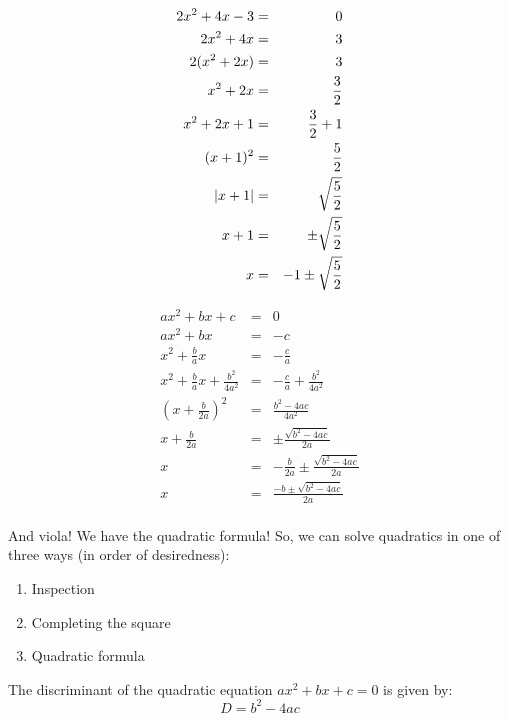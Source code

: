 \documentclass[letterpaper,12pt,fleqn]{article}
\begin{document}
\begin{minipage}[t]{3in}
  \begin{eqnarray*}
    2x^2+4x-3 &=& 0 \\
    2x^2+4x &=& 3 \\
    2(x^2+2x) &=& 3 \\
    x^2+2x &=& \frac{3}{2} \\
    x^2+2x+1 &=& \frac{3}{2}+1 \\
    (x+1)^2 &=& \frac{5}{2} \\
    \lvert x+1\rvert &=& \sqrt{\frac{5}{2}} \\
    x+1 &=& \pm\sqrt{\frac{5}{2}} \\
    x &=& -1\pm\sqrt{\frac{5}{2}} \\
  \end{eqnarray*}
\end{minipage}
\begin{minipage}[t]{3in}
  \begin{eqnarray*}
    ax^2+bx+c &=& 0 \\
    ax^2+bx &=& -c \\
    x^2+\frac{b}{a}x &=& -\frac{c}{a} \\
    x^2+\frac{b}{a}x+\frac{b^2}{4a^2} &=& -\frac{c}{a}+\frac{b^2}{4a^2} \\
    \left(x+\frac{b}{2a}\right)^2 &=& \frac{b^2-4ac}{4a^2} \\
    x+\frac{b}{2a} &=& \pm\frac{\sqrt{b^2-4ac}}{2a} \\
    x &=& -\frac{b}{2a}\pm\frac{\sqrt{b^2-4ac}}{2a} \\
    x &=& \frac{-b\pm\sqrt{b^2-4ac}}{2a} \\
  \end{eqnarray*}
\end{minipage}

And viola! We have the quadratic formula! So, we can solve quadratics in one
of three ways (in order of desiredness):
\begin{enumerate}
\item Inspection
\item Completing the square
\item Quadratic formula
\end{enumerate}

\begin{definition}
  The discriminant of the quadratic equation $ax^2+bx+c=0$ is given by:
  \[D=b^2-4ac\]
\end{definition}
\end{document}
